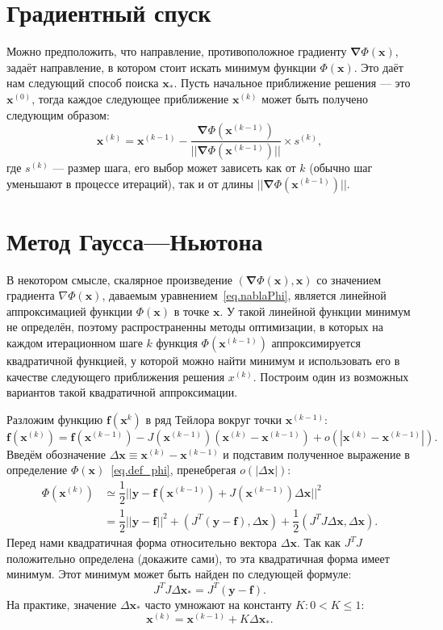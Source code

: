 \documentclass[fontsize=12pt, paper=a4]{article}
\renewcommand{\vec}[1]{\mathbf{#1}}
\def\x{\vec{x}}
\def\y{\vec{y}}
\def\f{\vec{f}}
\def\vnabla{\vec{\nabla}}
\def\m{\x_*}
\begin{document}
\section{Градиентный спуск}
Можно предположить, что направление, противоположное градиенту $\vnabla \Phi(\x)$, задаёт направление, в котором стоит искать минимум функции $\Phi(\x)$.
Это даёт нам следующий способ поиска $\m$.
Пусть начальное приближение решения — это $\x^{(0)}$, тогда каждое следующее приближение $\x^{(k)}$ может быть получено следующим образом:
\begin{equation}
\x^{(k)} = \x^{(k-1)} - \dfrac{\vnabla{\Phi(\x^{(k-1)})}}{||\vnabla{\Phi(\x^{(k-1)})}||} \times s^{(k)},
\end{equation}
где $s^{(k)}$ — размер шага, его выбор может зависеть как от $k$ (обычно шаг уменьшают в процессе итераций), так и от длины $||\vnabla{\Phi(\x^{(k-1)})}||$.


\section{Метод Гаусса---Ньютона}
В некотором смысле, скалярное произведение $(\vnabla\Phi(\x), \x)$ со значением градиента $\nabla\Phi(\x)$, даваемым уравнением~\eqref{eq.nablaPhi}, является линейной аппроксимацией функции $\Phi(\x)$ в точке $\x$.
У такой линейной функции минимум не определён, поэтому распространенны методы оптимизации, в которых на каждом итерационном шаге $k$ функция $\Phi(\x^{(k-1)})$ аппроксимируется квадратичной функцией, у которой можно найти минимум и использовать его в качестве следующего приближения решения $x^{(k)}$.
Построим один из возможных вариантов такой квадратичной аппроксимации.

Разложим функцию $\f(\x^{k})$ в ряд Тейлора вокруг точки $\x^{(k-1)}$:
\begin{equation}
\f(\x^{(k)}) = \f(\x^{(k-1)}) - J(\x^{(k-1)}) (\x^{(k)} - \x^{(k-1)}) + o(|\x^{(k)} - \x^{(k-1)}|).
\end{equation}
Введём обозначение $\Delta \x \equiv \x^{(k)} - \x^{(k-1)}$ и подставим полученное выражение в определение $\Phi(\x)$~\eqref{eq.def_phi}, пренебрегая $o(|\Delta\x|)$:
\begin{equation} \label{eq.Phi_GN}
\begin{split}
\Phi(\x^{(k)}) &\simeq \dfrac12 ||\y - \f(\x^{(k-1)}) + J(\x^{(k-1)}) \Delta\x||^2 \\
 &= \dfrac12 ||\y - \f||^2 + (J^T(\y - \f), \Delta\x) + \dfrac12 (J^TJ\Delta\x, \Delta\x).
\end{split}
\end{equation}
Перед нами квадратичная форма относительно вектора $\Delta\x$.
Так как $J^TJ$ положительно определена (докажите сами), то эта квадратичная форма имеет минимум.
Этот минимум может быть найден по следующей формуле:
\begin{equation}
J^TJ \Delta\m = J^T (\y - \f). \label{eq.Gauss_Newton}
\end{equation}
На практике, значение $\Delta\m$ часто умножают на константу $K: 0 < K \leq 1$:
\begin{equation}
\x^{(k)} = \x^{(k-1)} + K \Delta\m.
\end{equation}
\end{document}
